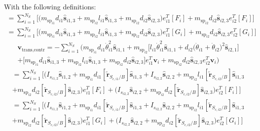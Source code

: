 With the following definitions:
\begin{multline}
	[A_{\text{contr}}] = \sum_{i=1}^{N_{S}}\bigg[\Big(m_{\text{sp}_{i1}}d_{i1} \bm{\hat{s}}_{i1,3} +m_{\text{sp}_{i2}}l_{i1} \bm{\hat{s}}_{i1,3}+m_{\text{sp}_{i2}} d_{i2}\bm{\hat{s}}_{i2,3}\Big)e_{i1}^T[F_i] +m_{\text{sp}_{i2}} d_{i2} \bm{\hat{s}}_{i2,3}e_{i2}^T[F_i] \bigg]
\end{multline}\begin{multline}
	[B_{\text{contr}}] =  \sum_{i=1}^{N_{S}}\bigg[\Big(m_{\text{sp}_{i1}}d_{i1} \bm{\hat{s}}_{i1,3} +m_{\text{sp}_{i2}}l_{i1}\bm{\hat{s}}_{i1,3}+m_{\text{sp}_{i2}} d_{i2}\bm{\hat{s}}_{i2,3}\Big) e_{i1}^T[G_i] +m_{\text{sp}_{i2}} d_{i2} \bm{\hat{s}}_{i2,3} e_{i2}^T[G_i]\bigg]
\end{multline}\begin{multline}
	\bm v_{\text{trans,contr}} = -\sum_{i=1}^{N_{S}}\bigg(m_{\text{sp}_{i1}}d_{i1} \dot{\theta}_{i1}^2 \bm{\hat{s}}_{i1,1} +m_{\text{sp}_{i2}}\Big[l_{i1} \dot{\theta}_{i1}^2 \bm{\hat{s}}_{i1,1} + d_{i2}\big(\dot{\theta}_{i1} + \dot{\theta}_{i2}\big)^2\bm{\hat{s}}_{i2,1}\Big]\\
	+\Big[m_{\text{sp}_{i1}}d_{i1} \bm{\hat{s}}_{i1,3} +m_{\text{sp}_{i2}}l_{i1} \bm{\hat{s}}_{i1,3}+m_{\text{sp}_{i2}} d_{i2}\bm{\hat{s}}_{i2,3}\Big]e_{i1}^T\bm v_i
	+m_{\text{sp}_{i2}} d_{i2} \bm{\hat{s}}_{i2,3}e_{i2}^T\bm v_i \bigg)
\end{multline}\begin{multline}
	[C_{\text{contr}}] = \sum\limits_{i=1}^{N_S} \bigg[  \big(I_{s_{i1,2}}\bm{\hat{s}}_{i1,2}+m_{\text{sp}_{i1}}d_{i1} [\tilde{\bm{r}}_{S_{c,i1}/B}]   \bm{\hat{s}}_{i1,3} + I_{s_{i2,2}}\bm{\hat{s}}_{i2,2}
	+m_{\text{sp}_{i2}}l_{i1} [\tilde{\bm{r}}_{S_{c,i2}/B}]  \bm{\hat{s}}_{i1,3}\\
	+m_{\text{sp}_{i2}}d_{i2} [\tilde{\bm{r}}_{S_{c,i2}/B}] \bm{\hat{s}}_{i2,3}\big)e_{i1}^T[F_i]
	+\big( I_{s_{i2,2}}\bm{\hat{s}}_{i2,2}+m_{\text{sp}_{i2}} d_{i2} [\tilde{\bm{r}}_{S_{c,i2}/B}] \bm{\hat{s}}_{i2,3}\big)e_{i2}^T[F_i] \bigg]
\end{multline}\begin{multline}
	[D_{\text{contr}}] = \sum\limits_{i=1}^{N_S} \bigg[  \big(I_{s_{i1,2}}\bm{\hat{s}}_{i1,2}+m_{\text{sp}_{i1}}d_{i1} [\tilde{\bm{r}}_{S_{c,i1}/B}]   \bm{\hat{s}}_{i1,3} + I_{s_{i2,2}}\bm{\hat{s}}_{i2,2}+m_{\text{sp}_{i2}}l_{i1} [\tilde{\bm{r}}_{S_{c,i2}/B}]  \bm{\hat{s}}_{i1,3}\\
	+m_{\text{sp}_{i2}}d_{i2} [\tilde{\bm{r}}_{S_{c,i2}/B}] \bm{\hat{s}}_{i2,3}\big)e_{i1}^T[G_i] +\big( I_{s_{i2,2}}\bm{\hat{s}}_{i2,2}+m_{\text{sp}_{i2}} d_{i2} [\tilde{\bm{r}}_{S_{c,i2}/B}] \bm{\hat{s}}_{i2,3}\big)e_{i2}^T[G_i] \bigg]\

\end{multline}
